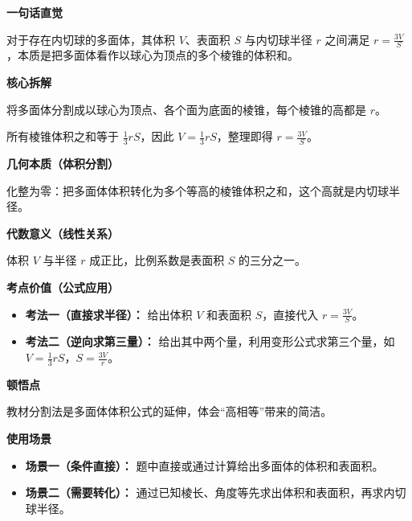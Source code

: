 \begin{explanationbox}
	\textbf{\textcolor{CExplanation}{一句话直觉}}

	对于存在内切球的多面体，其体积 $V$、表面积 $S$ 与内切球半径 $r$ 之间满足 $r = \frac{3V}{S}$，本质是把多面体看作以球心为顶点的多个棱锥的体积和。

	\medskip
	\textbf{\textcolor{CExplanation}{核心拆解}}
	\begin{description}[style=nextline, leftmargin=2.8em, labelsep=0.5em, itemsep=0.45em]
		\item[\textbf{要点一（分割思想）：}] 将多面体分割成以球心为顶点、各个面为底面的棱锥，每个棱锥的高都是 $r$。
		\item[\textbf{要点二（体积求和）：}] 所有棱锥体积之和等于 $\frac{1}{3}rS$，因此 $V = \frac{1}{3}rS$，整理即得 $r=\frac{3V}{S}$。
	\end{description}

	\medskip
	\textbf{\textcolor{CExplanation}{几何本质（体积分割）}}

	化整为零：把多面体体积转化为多个等高的棱锥体积之和，这个高就是内切球半径。

	\medskip
	\textbf{\textcolor{CExplanation}{代数意义（线性关系）}}

	体积 $V$ 与半径 $r$ 成正比，比例系数是表面积 $S$ 的三分之一。

	\medskip
	\textbf{\textcolor{CExplanation}{考点价值（公式应用）}}
	\begin{itemize}[leftmargin=*, itemsep=0.5em, topsep=0.4em]
		\item \textbf{考法一（直接求半径）：} 给出体积 $V$ 和表面积 $S$，直接代入 $r=\frac{3V}{S}$。
		\item \textbf{考法二（逆向求第三量）：} 给出其中两个量，利用变形公式求第三个量，如 $V=\frac{1}{3}rS$，$S=\frac{3V}{r}$。
	\end{itemize}

	\medskip
	\textbf{\textcolor{CExplanation}{顿悟点}}

	教材分割法是多面体体积公式的延伸，体会“高相等”带来的简洁。

	\medskip
	\textbf{\textcolor{CExplanation}{使用场景}}
	\begin{itemize}[leftmargin=*, itemsep=0.5em, topsep=0.4em]
		\item \textbf{场景一（条件直接）：} 题中直接或通过计算给出多面体的体积和表面积。
		\item \textbf{场景二（需要转化）：} 通过已知棱长、角度等先求出体积和表面积，再求内切球半径。
	\end{itemize}
\end{explanationbox}
